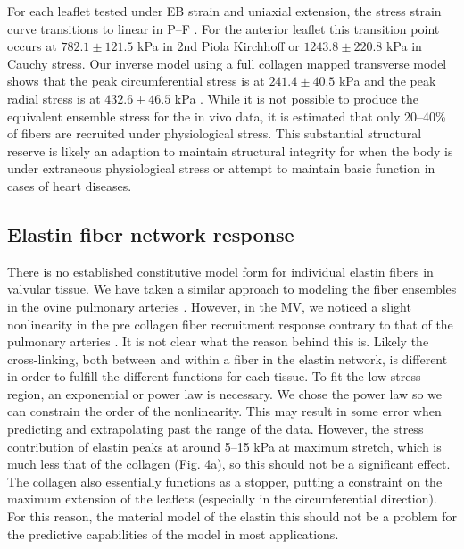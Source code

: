     For each leaflet tested under EB strain and uniaxial extension, the stress strain curve transitions to linear in P–F \cite{sasaki_elongation_1996}\cite{sasaki_stress_1996}\cite{liao_relation_2007}. For the anterior leaflet this transition point occurs at $782.1\pm121.5$ kPa in 2nd Piola Kirchhoff or $1243.8\pm220.8$ kPa in Cauchy stress. Our inverse model using a full collagen mapped transverse model shows that the peak circumferential stress is at $241.4\pm40.5$ kPa and the peak radial stress is at $432.6\pm46.5$ kPa \cite{lee_inverse_2014}. While it is not possible to produce the equivalent ensemble stress for the in vivo data, it is estimated that only 20–40\% of fibers are recruited under physiological stress. This substantial structural reserve is likely an adaption to maintain structural integrity for when the body is under extraneous physiological stress or attempt to maintain basic function in cases of heart diseases.
    



\subsection{Elastin fiber network response}

    There is no established constitutive model form for individual elastin fibers in valvular tissue. We have taken a similar approach to modeling the fiber ensembles in the ovine pulmonary arteries \cite{fata_insights_2014}. However, in the MV, we noticed a slight nonlinearity in the pre collagen fiber recruitment response contrary to that of the pulmonary arteries \cite{fata_insights_2014}. It is not clear what the reason behind this is. Likely the cross-linking, both between and within a fiber in the elastin network, is different in order to fulfill the different functions for each tissue. To fit the low stress region, an exponential or power law is necessary. We chose the power law so we can constrain the order of the nonlinearity. This may result in some error when predicting and extrapolating past the range of the data. However, the stress contribution of elastin peaks at around 5–15 kPa at maximum stretch, which is much less that of the collagen (Fig. 4a), so this should not be a significant effect. The collagen also essentially functions as a stopper, putting a constraint on the maximum extension of the leaflets (especially in the circumferential direction). For this reason, the material model of the elastin this should not be a problem for the predictive capabilities of the model in most applications.


